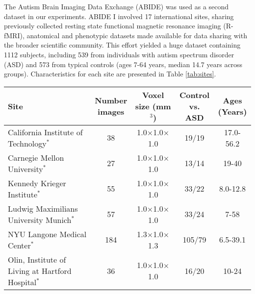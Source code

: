 \documentclass[twoside,fleqn,espcrc2]{elsarticle}
\begin{document}
The Autism Brain Imaging Data Exchange (ABIDE) \cite{di2014autism} was used as a second dataset in our experiments. ABIDE I involved 17 international sites, sharing previously collected resting state functional magnetic resonance imaging (R-fMRI), anatomical and phenotypic datasets made available for data sharing with the broader scientific community. This effort yielded a huge dataset containing 1112 subjects, including 539 from individuals with autism spectrum disorder (ASD) and 573 from typical controls (ages 7-64 years, median 14.7 years across groups). Characteristics for each site are presented in Table \ref{tab:sites}.

\begin{table}[htb!]
\centering
\footnotesize
\begin{tabular}{lcccc}
\toprule
\addlinespace
\parbox{4.8cm}{\textbf{Site}} &
\parbox{1.cm}{\textbf{Number \\ images}} &
\parbox{1.7cm}{\textbf{Voxel size \\ (mm$^3$) } }  &
\parbox{1.3cm}{\textbf{Control \\vs. ASD}}   &
\parbox{1.5cm}{\textbf{Ages \\(Years)}}\\
\midrule
\addlinespace
\parbox{4.8cm}{California Institute of Technology$^*$} &
\parbox{1.cm}{38} &
\parbox{1.7cm}{1.0$\times$1.0$\times$1.0}   &
\parbox{1.3cm}{19/19}   &
\parbox{1.5cm}{17.0-56.2}\\
\addlinespace
\parbox{4.8cm}{Carnegie Mellon University$^*$} &
\parbox{1.cm}{27} &
\parbox{1.7cm}{1.0$\times$1.0$\times$1.0}   &
\parbox{1.3cm}{13/14}    &
\parbox{1.5cm}{19-40}\\

\addlinespace
\parbox{4.8cm}{Kennedy Krieger Institute$^*$} &
\parbox{1.cm}{55} &
\parbox{1.7cm}{1.0$\times$1.0$\times$1.0}   &
\parbox{1.3cm}{33/22}    &
\parbox{1.5cm}{8.0-12.8}\\

\addlinespace
\parbox{4.8cm}{Ludwig Maximilians
University Munich$^*$} &
\parbox{1.cm}{57} &
\parbox{1.7cm}{1.0$\times$1.0$\times$1.0}   &
\parbox{1.3cm}{33/24}    &
\parbox{1.5cm}{7-58}\\

\addlinespace
\parbox{4.8cm}{NYU Langone Medical Center$^*$} &
\parbox{1.cm}{184} &
\parbox{1.7cm}{1.3$\times$1.0$\times$1.3}   &
\parbox{1.3cm}{105/79}    &
\parbox{1.5cm}{6.5-39.1}\\

\addlinespace
\parbox{4.8cm}{Olin, Institute of Living
at Hartford Hospital$^*$} &
\parbox{1.cm}{36} &
\parbox{1.7cm}{1.0$\times$1.0$\times$1.0}   &
\parbox{1.3cm}{16/20}    &
\parbox{1.5cm}{10-24}\\


\end{tabular}
\end{table}
\end{document}
